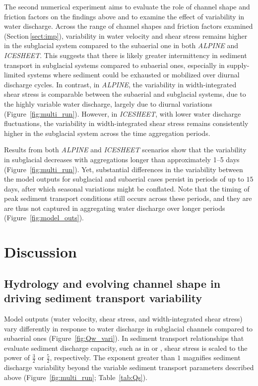 \documentclass[draft]{agujournal2019}
\newcommand{\alpine}{\textit{ALPINE}}
\newcommand{\icesheet}{\textit{ICESHEET}}
\begin{document}
The second numerical experiment aims to evaluate the role of channel shape and friction factors on the findings above and to examine the effect of variability in water discharge.
Across the range of channel shapes and friction factors  examined (Section\,\ref{sect:imp}), variability in water velocity and shear stress remains higher in the subglacial system compared to the subaerial one in both \alpine{} and \icesheet{}.
This suggests that there is likely greater intermittency in sediment transport in subglacial systems compared to subaerial ones, especially in supply-limited systems where sediment could be exhausted or mobilized over diurnal discharge cycles.
In contrast, in \alpine{}, the variability in width-integrated shear stress is comparable between the subaerial and subglacial systems, due to the highly variable water discharge, largely due to diurnal variations (Figure~\ref{fig:multi_run}).
However, in \icesheet{}, with lower water discharge fluctuations, the variability in width-integrated shear stress remains consistently higher in the subglacial system across the time aggregation periods.

Results from  both \alpine{} and \icesheet{} scenarios show that the variability in subglacial  decreases with aggregations longer than approximately 1--5 days (Figure~\ref{fig:multi_run}).
Yet, substantial differences in the variability between the model outputs for subglacial and subaerial cases persist in periods of up to $15$ days, after which seasonal variations might be conflated.
Note that the timing of peak sediment transport conditions still occurs across these periods, and they are are thus not captured in aggregating water discharge over longer periods (Figure~\ref{fig:model_outs}).

\section{Discussion}

\subsection{Hydrology and evolving channel shape in driving sediment transport variability}
\label{sect:dis_qsc}

Model outputs (water velocity, shear stress, and width-integrated shear stress) vary differently in response to water discharge in subglacial channels compared to subaerial ones (Figure~\ref{fig:Qw_vari}).
In sediment transport relationships that evaluate sediment discharge capacity, such as in  or , shear stress is scaled to the power of $\frac{3}{2}$ or $\frac{5}{2}$, respectively.
The exponent greater than $1$ magnifies sediment discharge variability beyond the variable sediment transport parameters described above (Figure~\ref{fig:multi_run}; Table~\ref{tab:Qs}).
\end{document}
